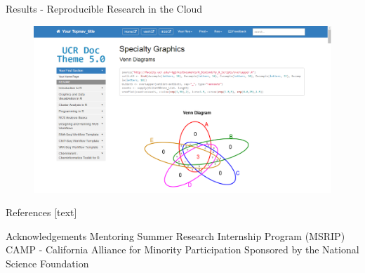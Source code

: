 \documentclass[final]{beamer}
\begin{document}
\begin{frame}[fragile]
\begin{columns}[t]
\begin{column}{0.31\linewidth}
\begin{minipage}[t][.955\textheight]{\linewidth}
\begin{block}{Results - Reproducible Research in the Cloud}
\begin{figure}
\includegraphics[width=\linewidth]{images/UCRdocTheme.png}
\end{figure}
\vspace{0ex}
\vfill
\end{block}
\vfill

\begin{block}{References}
\footnotesize
{}[text]
\vspace{-1ex}


\normalsize
\vfill
\end{block} 
\vfill

\vspace{0ex}
\begin{block}{Acknowledgements}
\vspace{0ex}
\normalsize
\center Mentoring Summer Research Internship Program (MSRIP)
\center CAMP - California Alliance for Minority Participation
\center Sponsored by the National Science Foundation
\vspace{0ex}
\vfill
\end{block} 
\vfill

\end{minipage}
\end{column}%




\end{columns}
\end{frame}
\end{document}
